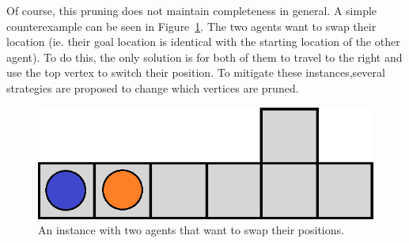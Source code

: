 



Of course, this pruning does not maintain completeness in general. A simple counterexample can be seen in Figure~\ref{fig:m_counterexample}. The two agents want to swap their location (ie. their goal location is identical with the starting location of the other agent). To do this, the only solution is for both of them to travel to the right and use the top vertex to switch their position. %
To mitigate these instances,several strategies are proposed to change which vertices are pruned.

\begin{figure}[ht]
\centering
\includegraphics[width=0.45\columnwidth]{img/m_counterexample.png}
\caption{An instance with two agents that want to swap their positions.}
\label{fig:m_counterexample}
\end{figure}

